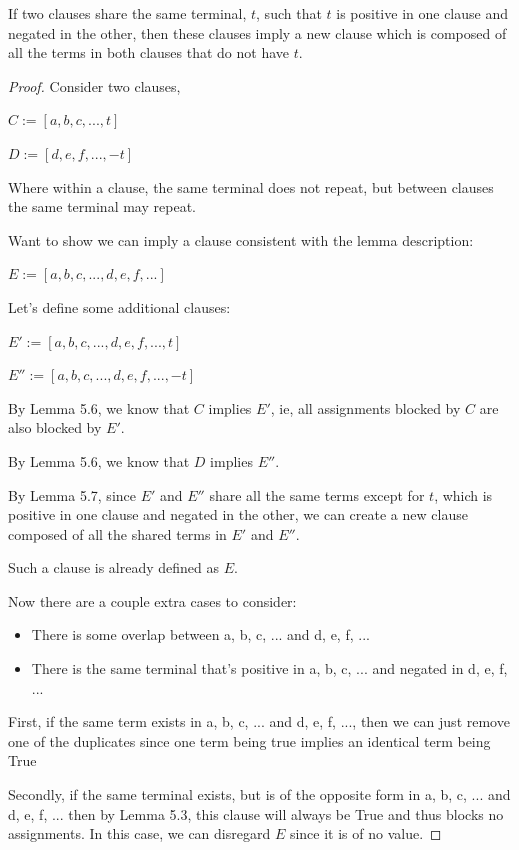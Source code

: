 \documentclass[manuscript]{acmart}
\begin{document}
    \begin{lemma}
        If two clauses share the same terminal, $t$, such that $t$ is 
        positive in one clause and negated in the other, then these clauses 
        imply a new clause which is composed of all the terms in both clauses 
        that do not have $t$.
    \end{lemma}
    \begin{proof}
        Consider two clauses, 

        $C := [a, b, c, ..., t]$
        
        $D := [d, e, f, ..., -t]$

        Where within a clause, the same terminal does not repeat, but between
        clauses the same terminal may repeat.

        Want to show we can imply a clause consistent with the lemma description:

        $E := [a, b, c, ..., d, e, f, ...]$

        Let's define some additional clauses:

        $E' := [a, b, c, ..., d, e, f, ..., t]$

        $E'' := [a, b, c, ..., d, e, f, ..., -t]$

        By Lemma 5.6, we know that $C$ implies $E'$, ie, all assignments blocked by
        $C$ are also blocked by $E'$.

        By Lemma 5.6, we know that $D$ implies $E''$.

        By Lemma 5.7, since $E'$ and $E''$ share all the same terms except 
        for $t$, which is positive in one clause and negated in the other, 
        we can create a new clause composed of all the shared terms in $E'$ 
        and $E''$.

        Such a clause is already defined as $E$.

        Now there are a couple extra cases to consider:
        
        \begin{itemize}
            \item There is some overlap between a, b, c, ... and d, e, f, ...
            \item There is the same terminal that's positive in a, b, c, ...
            and negated in d, e, f, ...
        \end{itemize}

        First, if the same term exists in a, b, c, ... and d, e, f, ..., then we
        can just remove one of the duplicates since one term being true implies an identical term being True

        Secondly, if the same terminal exists, but is of the opposite form in a, b, c, ... and d, e, f, ...
        then by Lemma 5.3, this clause will always be True and thus blocks no assignments. In this case, 
        we can disregard $E$ since it is of no value.
        
    \end{proof}
\end{document}
